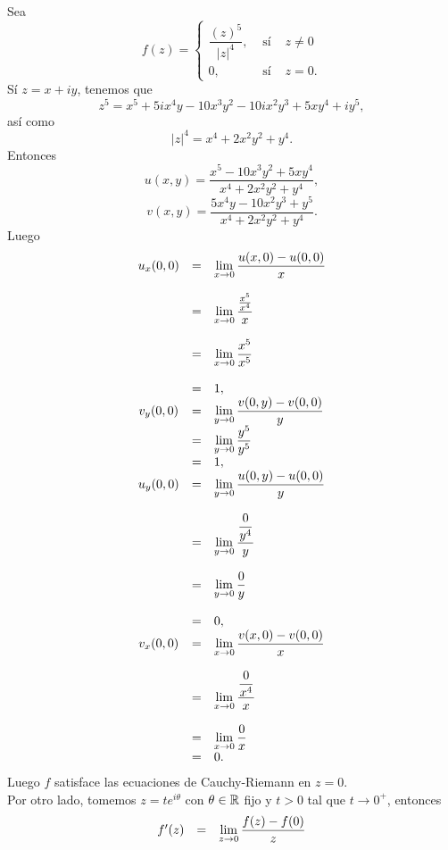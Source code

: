 \begin{Ejem}
	Sea 
	\[
		f(z)= \left\{\begin{array}{ccl}
			\dfrac{(z)^5}{|z|^4}, &\mbox{ sí }& z\neq 0\\
			0,&\mbox{ sí }&z=0.
		\end{array} \right. 
	\] 
	 Sí $z=x+iy$, tenemos que $$z^5=x^5+5ix^4y-10x^3y^2-10ix^2y^3+5xy^4+iy^5,$$ así como $$|z|^4=x^4+2 x^2 y^2+y^4.$$
	 Entonces $$u(x,y)=\dfrac{x^5 - 10 x^3 y^2  + 5 x y^4 }{x^4 + 2 x^2 y^2 + y^4},$$  $$v(x,y)=\dfrac{ 5  x^4 y  - 10  x^2 y^3 +  y^5}{x^4 + 2 x^2 y^2 + y^4}.$$Luego
	\[
		\begin{array}{ccl}
			u_x(0,0)&=&\displaystyle\lim_{x\rightarrow 0}\dfrac{u(x,0)-u(0,0)}{x}\\\\
			&=&\displaystyle\lim_{x\rightarrow 0}\dfrac{\frac{x^5}{x^4}}{x}\\\\
			&=&\displaystyle\lim_{x\rightarrow 0}\dfrac{x^5}{x^5}\\\\
			&=&1,\\
			v_y(0,0)&=&\displaystyle\lim_{y\rightarrow 0}\dfrac{v(0,y)-v(0,0)}{y}\\
			&=&\displaystyle\lim_{y\rightarrow 0}\dfrac{y^5}{y^5}\\
			&=&1,\\
			u_y(0,0)&=&\displaystyle\lim_{y\rightarrow 0}\dfrac{u(0,y)-u(0,0)}{y}\\\\
			&=&\displaystyle\lim_{y\rightarrow 0}\dfrac{\dfrac{0}{y^4}}{y}\\\\
			&=&\displaystyle\lim_{y\rightarrow 0}\dfrac{0}{y}\\\\
			&=&0,\\
			v_x(0,0)&=&\displaystyle\lim_{x\rightarrow 0}\dfrac{v(x,0)-v(0,0)}{x}\\\\
			&=&\displaystyle\lim_{x\rightarrow 0}\dfrac{\dfrac{0}{x^4}}{x}\\\\
			&=&\displaystyle\lim_{x\rightarrow 0}\dfrac{0}{x}\\
			&=&0.
		\end{array}
	\]
	Luego $f$ satisface las ecuaciones de Cauchy-Riemann en $z=0$.\\
	Por otro lado, tomemos $z=te^{i\theta}$ con $\theta\in \mathbb{R}$ fijo y $t>0$  tal que $t\rightarrow0^{+}$, entonces
	\[
		\begin{array}{ccl}
			f'(z)&=&\displaystyle\lim_{z\rightarrow0}\displaystyle\dfrac{f(z)-f(0)}{z}\\\\

\end{array}\]
\end{Ejem}
